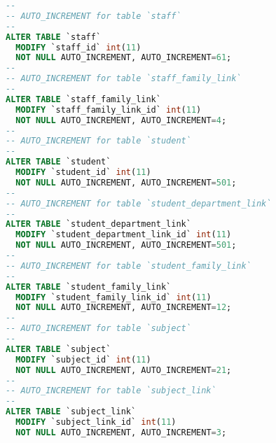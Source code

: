 \begin{lstlisting}[language=sql, caption=Database Generation Script, style=mystyle]
--
-- AUTO_INCREMENT for table `staff`
--
ALTER TABLE `staff`
  MODIFY `staff_id` int(11) 
  NOT NULL AUTO_INCREMENT, AUTO_INCREMENT=61;
--
-- AUTO_INCREMENT for table `staff_family_link`
--
ALTER TABLE `staff_family_link`
  MODIFY `staff_family_link_id` int(11) 
  NOT NULL AUTO_INCREMENT, AUTO_INCREMENT=4;
--
-- AUTO_INCREMENT for table `student`
--
ALTER TABLE `student`
  MODIFY `student_id` int(11) 
  NOT NULL AUTO_INCREMENT, AUTO_INCREMENT=501;
--
-- AUTO_INCREMENT for table `student_department_link`
--
ALTER TABLE `student_department_link`
  MODIFY `student_department_link_id` int(11) 
  NOT NULL AUTO_INCREMENT, AUTO_INCREMENT=501;
--
-- AUTO_INCREMENT for table `student_family_link`
--
ALTER TABLE `student_family_link`
  MODIFY `student_family_link_id` int(11) 
  NOT NULL AUTO_INCREMENT, AUTO_INCREMENT=12;
--
-- AUTO_INCREMENT for table `subject`
--
ALTER TABLE `subject`
  MODIFY `subject_id` int(11) 
  NOT NULL AUTO_INCREMENT, AUTO_INCREMENT=21;
--
-- AUTO_INCREMENT for table `subject_link`
--
ALTER TABLE `subject_link`
  MODIFY `subject_link_id` int(11) 
  NOT NULL AUTO_INCREMENT, AUTO_INCREMENT=3;
\end{lstlisting}